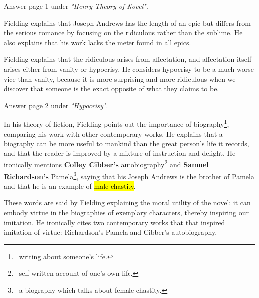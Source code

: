 \documentclass[12pt, a4paper]{article}
\begin{document}
Answer page 1 under \textit{"Henry Theory of Novel"}.




Fielding explains that Joseph Andrews has
the length of an epic but differs from the serious romance by focusing on the ridiculous rather than the sublime.
He also explains that his work lacks the meter found in all epics.


Fielding explains that the ridiculous arises from affectation, and 
affectation itself arises either from vanity or hypocrisy. He considers hypocrisy to be a 
much worse vice than vanity, because it is more surprising and more ridiculous 
when we discover that someone is the exact opposite of what they claims to be.




Answer page 2 under \textit{"Hypocrisy"}.



\ind In his theory of fiction, Fielding points out the importance of biography\footnote{
\, writing about someone's life.}, comparing his work with other contemporary works.
He explains that a biography can be more useful to mankind than the great person's
life it records, and that the reader is improved by a mixture of instruction and delight.
He ironically mentions \textbf{Colley Cibber's} autobiography\footnote{\, self-written account of one's own life.}
and \textbf{Samuel Richardson's} Pamela\footnote{\, a biography which talks about female chastity.},
saying that his Joseph Andrews is the brother of Pamela and
that he is an example of \hl{male chastity}.



These words are said by Fielding explaining the moral utility of the novel:
it can embody virtue in the biographies of
exemplary characters, thereby inspiring our imitation. He ironically cites two contemporary works that 
that inspired imitation of virtue: Richardson’s Pamela and Cibber’s autobiography.
\end{document}
